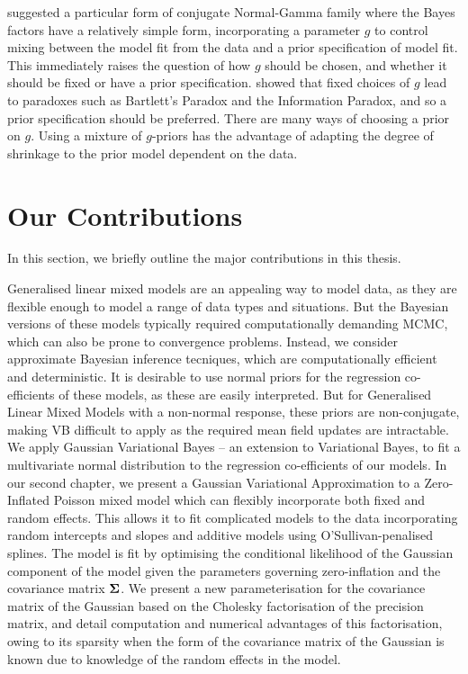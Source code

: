 \cite{Zellner1986} suggested a particular form of conjugate Normal-Gamma family where the Bayes factors have a
relatively simple form, incorporating a parameter $g$ to control mixing between the model fit from the data
and a prior specification of model fit. This immediately raises the question of how $g$ should be chosen, and
whether it should be fixed or have a prior specification. \cite{Liang2008} showed that fixed choices of $g$
lead to paradoxes such as Bartlett's Paradox and the Information Paradox, and so a prior specification should
be preferred. There are many ways of choosing a prior on $g$. Using a mixture of $g$-priors has the advantage
of adapting the degree of shrinkage to the prior model dependent on the data.

\section{Our Contributions}

In this section, we briefly outline the major contributions in this thesis.

Generalised linear mixed models are an appealing way to model data, as they are flexible enough to model a
range of data types and situations. But the Bayesian versions of these models typically required 
computationally demanding MCMC, which can also be prone to convergence problems. Instead, we consider approximate Bayesian inference tecniques, which are computationally efficient and deterministic. It is
desirable to use normal priors for the regression co-efficients of these models, as these are easily
interpreted. But for Generalised Linear Mixed Models with a non-normal response, these priors are
non-conjugate, making VB difficult to apply as the required mean field updates are intractable. We apply
Gaussian Variational Bayes -- an extension to Variational Bayes, to fit a multivariate normal distribution
to the regression co-efficients of our models.
In our second chapter, we present a Gaussian Variational Approximation to a Zero-Inflated Poisson mixed model
which can flexibly incorporate both fixed and random effects. This allows it to fit complicated models
to the data incorporating random intercepts and slopes and additive models using O'Sullivan-penalised splines.
The model is fit by optimising the conditional likelihood of the Gaussian component of the model given the
parameters governing zero-inflation and the covariance matrix ${\boldsymbol \Sigma}$.
We present a new parameterisation for the covariance matrix of the Gaussian based on the Cholesky
factorisation of the precision matrix, and detail computation and numerical advantages of this
factorisation, owing to its sparsity when the form of the covariance matrix of the Gaussian is known due to
knowledge of the random effects in the model.

